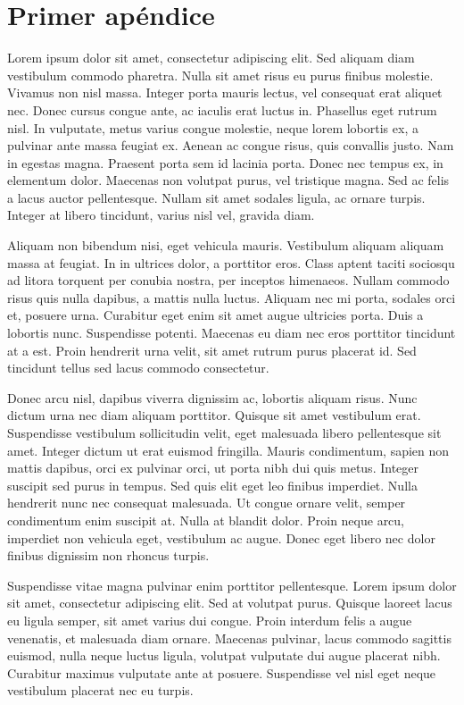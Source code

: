  \appendix
\chapter{Primer apéndice}\label{aped.A}

Lorem ipsum dolor sit amet, consectetur adipiscing elit. Sed aliquam diam vestibulum commodo pharetra. Nulla sit amet risus eu purus finibus molestie. Vivamus non nisl massa. Integer porta mauris lectus, vel consequat erat aliquet nec. Donec cursus congue ante, ac iaculis erat luctus in. Phasellus eget rutrum nisl. In vulputate, metus varius congue molestie, neque lorem lobortis ex, a pulvinar ante massa feugiat ex. Aenean ac congue risus, quis convallis justo. Nam in egestas magna. Praesent porta sem id lacinia porta. Donec nec tempus ex, in elementum dolor. Maecenas non volutpat purus, vel tristique magna. Sed ac felis a lacus auctor pellentesque. Nullam sit amet sodales ligula, ac ornare turpis. Integer at libero tincidunt, varius nisl vel, gravida diam.

Aliquam non bibendum nisi, eget vehicula mauris. Vestibulum aliquam aliquam massa at feugiat. In in ultrices dolor, a porttitor eros. Class aptent taciti sociosqu ad litora torquent per conubia nostra, per inceptos himenaeos. Nullam commodo risus quis nulla dapibus, a mattis nulla luctus. Aliquam nec mi porta, sodales orci et, posuere urna. Curabitur eget enim sit amet augue ultricies porta. Duis a lobortis nunc. Suspendisse potenti. Maecenas eu diam nec eros porttitor tincidunt at a est. Proin hendrerit urna velit, sit amet rutrum purus placerat id. Sed tincidunt tellus sed lacus commodo consectetur.

Donec arcu nisl, dapibus viverra dignissim ac, lobortis aliquam risus. Nunc dictum urna nec diam aliquam porttitor. Quisque sit amet vestibulum erat. Suspendisse vestibulum sollicitudin velit, eget malesuada libero pellentesque sit amet. Integer dictum ut erat euismod fringilla. Mauris condimentum, sapien non mattis dapibus, orci ex pulvinar orci, ut porta nibh dui quis metus. Integer suscipit sed purus in tempus. Sed quis elit eget leo finibus imperdiet. Nulla hendrerit nunc nec consequat malesuada. Ut congue ornare velit, semper condimentum enim suscipit at. Nulla at blandit dolor. Proin neque arcu, imperdiet non vehicula eget, vestibulum ac augue. Donec eget libero nec dolor finibus dignissim non rhoncus turpis.

Suspendisse vitae magna pulvinar enim porttitor pellentesque. Lorem ipsum dolor sit amet, consectetur adipiscing elit. Sed at volutpat purus. Quisque laoreet lacus eu ligula semper, sit amet varius dui congue. Proin interdum felis a augue venenatis, et malesuada diam ornare. Maecenas pulvinar, lacus commodo sagittis euismod, nulla neque luctus ligula, volutpat vulputate dui augue placerat nibh. Curabitur maximus vulputate ante at posuere. Suspendisse vel nisl eget neque vestibulum placerat nec eu turpis.


